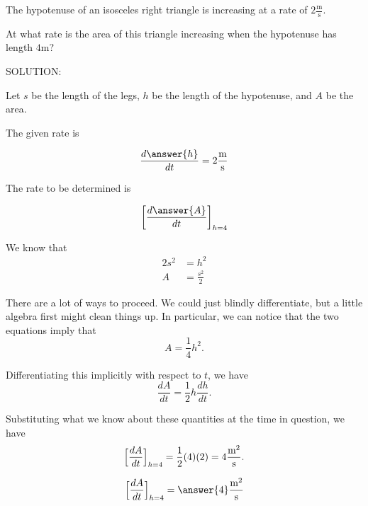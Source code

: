 \documentclass{ximera}
\author{Steven Gubkin}
\begin{document}
\begin{exercise}

The hypotenuse of an isosceles right triangle is increasing at a rate
of $2 \frac{\textrm{m}}{\textrm{s}}$.

At what rate is the area of this triangle increasing when the
hypotenuse has length $4 \textrm{m}$?



SOLUTION:

  Let $s$ be the length of the legs, $h$ be the length of the
  hypotenuse, and $A$ be the area. 


The given rate is

\[
\frac{d\answer{h}}{dt}=2\frac{\textrm{m}}{\textrm{s}}
\]



The rate to be determined  is

\[
\left[\frac{d\answer{A}}{dt}\right]_{h=4} 
\]

\begin{hint}
 We know that
\begin{align*}
	2s^2 &= h^2\\
	A &=\frac{s^2}{2}
\end{align*}
\end{hint}

\begin{hint}
  There are a lot of ways to proceed.  We could just blindly
  differentiate, but a little algebra first might clean things up.  In
  particular, we can notice that the two equations imply that
\[
A = \frac{1}{4} h^2.
\]
\end{hint}

\begin{hint}
  Differentiating this implicitly with respect to $t$, we have
\[
\frac{dA}{dt} = \frac{1}{2} h \frac{dh}{dt}.
\]
\end{hint}

\begin{hint}
  Substituting what we know about these quantities at the time in
  question, we have
  \[
 \Bigl[ \frac{dA}{dt} \Bigr]_{h=4}= \frac{1}{2} (4) (2) = 4\frac{\textrm{m}^2}{\textrm{s}}.
  \]
\end{hint}

\begin{prompt}
  \[
 \Bigl[ \frac{dA}{dt} \Bigr]_{h=4} = \answer{4}\frac{\textrm{m}^2}{\textrm{s}}
  \]
\end{prompt}
\end{exercise}
\end{document}

